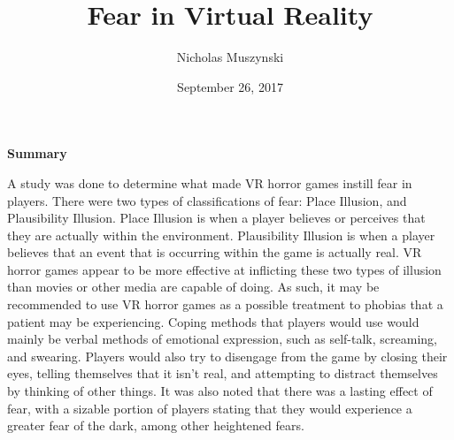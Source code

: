 \documentclass{article}
\begin{document}
\title{Fear in Virtual Reality}
\author{Nicholas Muszynski}
\date{September 26, 2017}

\maketitle

\textbf{Summary}
\newline


A study was done to determine what made VR horror games instill fear in players. 
There were two types of classifications of fear: Place Illusion, and Plausibility Illusion. 
Place Illusion is when a player believes or perceives that they are actually within the environment. 
Plausibility Illusion is when a player believes that an event that is occurring within the game is actually real. 
VR horror games appear to be more effective at inflicting these two types of illusion than movies or other media are capable of doing. 
As such, it may be recommended to use VR horror games as a possible treatment to phobias that a patient may be experiencing. 
Coping methods that players would use would mainly be verbal methods of emotional expression, such as self-talk, screaming, and swearing. 
Players would also try to disengage from the game by closing their eyes, telling themselves that it isn't real, and attempting to distract themselves by thinking of other things. 
It was also noted that there was a lasting effect of fear, with a sizable portion of players stating that they would experience a greater fear of the dark, among other heightened fears.


\nocite{article2cite}



\end{document}
